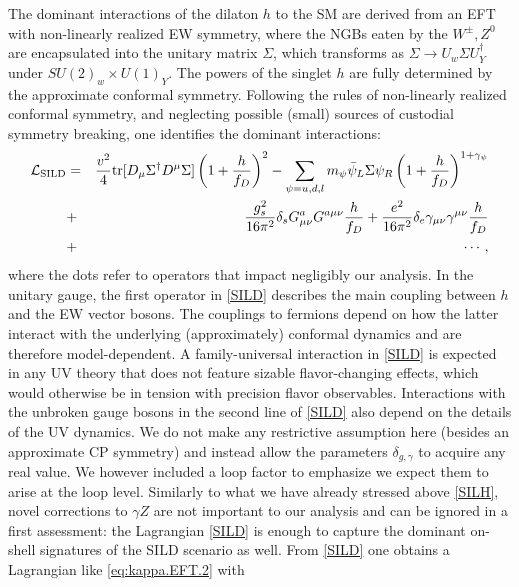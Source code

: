 The dominant interactions of the dilaton $h$ to the SM are derived from an EFT with non-linearly realized EW symmetry, where the NGBs eaten by the $W^\pm,Z^0$ are encapsulated into the unitary matrix $\Sigma$, which transforms as $\Sigma\to U_w\Sigma U_Y^\dagger$ under $SU(2)_w\times U(1)_Y$. The powers of the singlet $h$ are fully determined by the approximate conformal symmetry. %
Following the rules of non-linearly realized conformal symmetry, and neglecting possible (small) sources of custodial symmetry breaking, one identifies the dominant interactions:~\cite{Goldberger:2008zz}
\begin{eqnarray}\label{SILD}
{\cal L}_{\rm SILD}&=&\frac{v^2}{4}{\rm tr}[D_\mu\Sigma^\dagger D^\mu\Sigma]\left(1+\frac{h}{f_D}\right)^2-\sum_{\psi=u,d,l}m_\psi\bar\psi_L\Sigma\psi_R\left(1+\frac{h}{f_D}\right)^{1+\gamma_\psi}\\\nonumber
&+&\frac{g_s^2}{16\pi^2}\delta_sG^a_{\mu\nu}G^{a\mu\nu}\frac{h}{f_D}+\frac{e^2}{16\pi^2}\delta_e\gamma_{\mu\nu}\gamma^{\mu\nu}\frac{h}{f_D}\\\nonumber
&+&\cdots,
\end{eqnarray}
where the dots refer to operators that impact negligibly our analysis. In the unitary gauge, the first operator in \eqref{SILD} describes the main coupling between $h$ and the EW vector bosons. The couplings to fermions depend on how the latter interact with the underlying (approximately) conformal dynamics and are therefore model-dependent. A family-universal interaction in \eqref{SILD} is expected in any UV theory that does not feature sizable flavor-changing effects, which would otherwise be in tension with precision flavor observables. %
Interactions with the unbroken gauge bosons in the second line of \eqref{SILD} also depend on the details of the UV dynamics. We do not make any restrictive assumption here (besides an approximate CP symmetry) and instead allow the parameters $\delta_{g,\gamma}$ to acquire any real value. We however included a loop factor to emphasize we expect them to arise at the loop level. Similarly to what we have already stressed above \eqref{SILH}, novel corrections to $\gamma Z$ are not important to our analysis and can be ignored in a first assessment: the Lagrangian \eqref{SILD} is enough to capture the dominant on-shell signatures of the SILD scenario as well. From \eqref{SILD} one obtains a Lagrangian like \eqref{eq:kappa.EFT.2} with 
